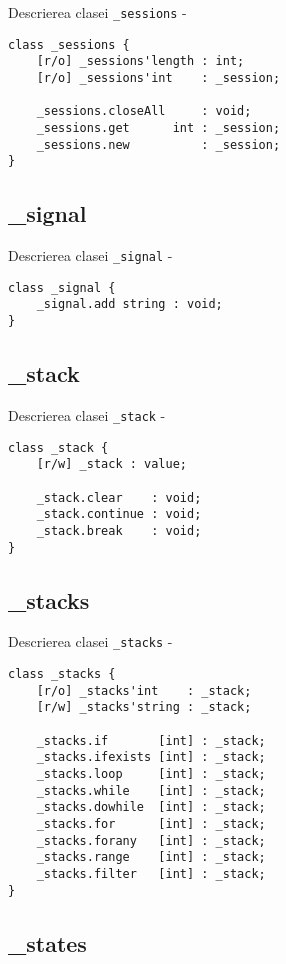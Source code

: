 \noindent Descrierea clasei \texttt{\_sessions} -
\begin{verbatim}
class _sessions {
	[r/o] _sessions'length : int;
	[r/o] _sessions'int    : _session;
	
	_sessions.closeAll     : void;
	_sessions.get      int : _session;
	_sessions.new          : _session;
}
\end{verbatim}

\subsection{{\color{orange} \_signal}}

\noindent Descrierea clasei \texttt{\_signal} -
\begin{verbatim}
class _signal {
	_signal.add string : void;
}
\end{verbatim}

\subsection{{\color{orange} \_stack}}

\noindent Descrierea clasei \texttt{\_stack} -
\begin{verbatim}
class _stack {
	[r/w] _stack : value;
	
	_stack.clear    : void;
	_stack.continue : void;
	_stack.break    : void;
}
\end{verbatim}

\subsection{{\color{orange} \_stacks}}

\noindent Descrierea clasei \texttt{\_stacks} -
\begin{verbatim}
class _stacks {
	[r/o] _stacks'int    : _stack;
	[r/w] _stacks'string : _stack;
	
	_stacks.if       [int] : _stack;
	_stacks.ifexists [int] : _stack;
	_stacks.loop     [int] : _stack;
	_stacks.while    [int] : _stack;
	_stacks.dowhile  [int] : _stack;
	_stacks.for      [int] : _stack;
	_stacks.forany   [int] : _stack;
	_stacks.range    [int] : _stack;
	_stacks.filter   [int] : _stack;
}
\end{verbatim}

\subsection{{\color{orange} \_states}}

